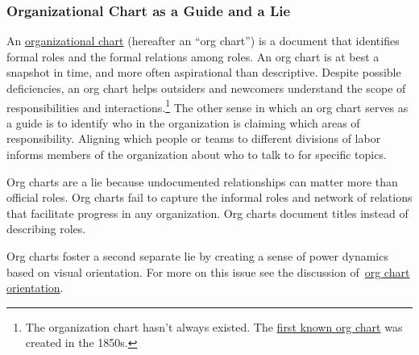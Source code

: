 \subsubsection*{Organizational Chart as a Guide and a Lie\label{sec:org-chart-as-guide-and-lie}}

An \href{https://en.wikipedia.org/wiki/Organizational_chart}{organizational chart} 
\iftoggle{WPinmargin}{\marginpar{$>$Wikipedia: Organizational chart}}{}
(hereafter an ``\gls{org chart}'') is a document that identifies formal roles and the formal relations among roles. An org chart is at best a snapshot in time, and more often aspirational than descriptive. Despite possible deficiencies, an org chart helps outsiders and newcomers understand the scope of responsibilities and interactions.\footnote{The organization chart hasn't always existed. The \href{https://en.wikipedia.org/wiki/George_Holt_Henshaw\%23First_organization_chart}{first known org chart} 
was created in the 1850s.} The other sense in which an org chart serves as a guide is to identify who in the organization is claiming which areas of responsibility. Aligning which people or teams to different divisions of labor informs members of the organization about who to talk to for specific topics.

Org charts are a lie because undocumented relationships can matter more than official roles. Org charts fail to capture the informal roles and network of relations that facilitate progress in any organization. Org charts document titles instead of describing roles.

Org charts foster a second separate lie by creating a sense of power dynamics based on visual orientation. For more on this issue see the discussion of~\hyperref[sec:org-chart-orientation]{org chart orientation}\iftoggle{haspagenumbers}{ on page~\pageref{sec:org-chart-orientation}}{}.
